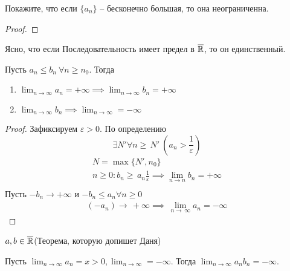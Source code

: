 \begin{exercise}
    Покажите, что если $ \{a_n\} $ -- бесконечно большая, то она неограниченна. 
\end{exercise}
\begin{proof}
    
\end{proof}
\begin{note}
    Ясно, что если Последовательность имеет предел в $\overline{\mathbb{R}} $, то он единственный.
\end{note}
\begin{theorem}
    Пусть $ a_n \leq  b_n \ \forall n \geq n_0$. Тогда \begin{enumerate}
        \item $ \lim_{n \to  \infty} a_n  = + \infty \implies \lim_{n \to \infty} b_n = + \infty $
        \item $ \lim_{n \to  \infty} b_n \implies  \lim_{n \to \infty} = - \infty$
    \end{enumerate}
\end{theorem} \begin{proof}
    Зафиксируем $ \varepsilon > 0 $. По определению \begin{equation}
        \exists N' \forall n \geq\, N'\ \left(a_n > \frac{1}{\varepsilon}\right)
    \end{equation}
    \begin{gather}
        N = \max\{N', n_0\} \\
        n \geq 0: b_n \geq\, a_n \frac{1}{\varepsilon} \implies \lim_{n \to n} b_n = + \infty \\
    \end{gather}
    Пусть $ - b_n \to  + \infty $ и $ - b_n \leq  a_n \forall n \geq  0 $
    \begin{gather}
        ( - a_n) \to\, + \infty \implies\, \lim_{n \to\, \infty} a_n = - \infty
    \end{gather}
\end{proof}
\begin{exercise}
    $ a, b \in  \overline{\mathbb{R}} $(Теорема, которую допишет Даня)
\end{exercise}
\begin{example}
    Пусть $ \lim_{n \to \infty} a_n = x > 0, \lim_{n \to  \infty} = - \infty $. Тогда $ \lim_{n \to \infty}a_n b_n = - \infty $.
\end{example}
